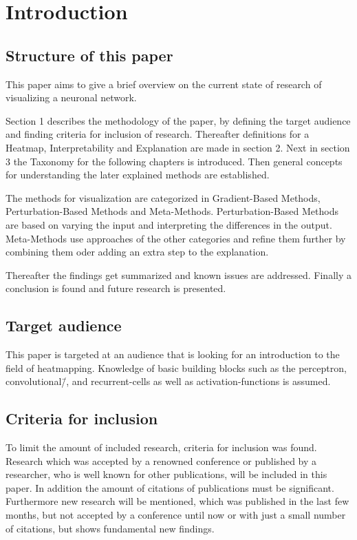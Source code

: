 \section{Introduction}

\subsection{Structure of this paper}
This paper aims to give a brief overview on the current state of research of visualizing a neuronal network. 
\par 
Section 1 describes the methodology of the paper, by defining the target audience and finding criteria for inclusion of research. Thereafter definitions for a Heatmap, Interpretability and Explanation are made in section 2. Next in section 3 the Taxonomy for the following chapters is introduced. Then general concepts for understanding the later explained methods are established.
\par
The methods for visualization are categorized in Gradient-Based Methods, Perturbation-Based Methods and Meta-Methods.
Perturbation-Based Methods are based on varying the input and interpreting the differences in the output.
Meta-Methods use approaches of the other categories and refine them further by combining them oder adding an extra step to the explanation.
\par
Thereafter the findings get summarized and known issues are addressed.
Finally a conclusion is found and future research is presented.

\subsection{Target audience}
This paper is targeted at an audience that is looking for an introduction to 
the field of heatmapping. Knowledge of basic building blocks such as the 
perceptron, convolutional\=/, and recurrent-cells as well as activation-functions is assumed.

\subsection{Criteria for inclusion}
To limit the amount of included research, criteria for inclusion was found. Research which was accepted by a renowned conference or published by a researcher, who is well known for other publications, will be included in this paper. In addition the amount of citations of publications must be significant. Furthermore new research will be mentioned, which was published in the last few months, but not accepted by a conference until now or with just a small number of citations, but shows fundamental new findings.